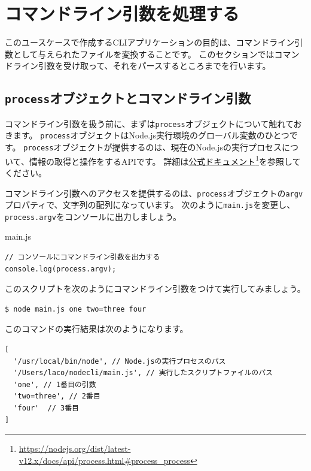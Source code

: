 \hypertarget{processing-commandline-args}{%
\section{コマンドライン引数を処理する}\label{processing-commandline-args}}

このユースケースで作成するCLIアプリケーションの目的は、コマンドライン引数として与えられたファイルを変換することです。
このセクションではコマンドライン引数を受け取って、それをパースするところまでを行います。

\hypertarget{process-object-and-commandline-args}{%
\subsection{\texorpdfstring{\texttt{process}オブジェクトとコマンドライン引数}{processオブジェクトとコマンドライン引数}}\label{process-object-and-commandline-args}}

コマンドライン引数を扱う前に、まずは\texttt{process}オブジェクトについて触れておきます。
\texttt{process}オブジェクトはNode.js実行環境のグローバル変数のひとつです。
\texttt{process}オブジェクトが提供するのは、現在のNode.jsの実行プロセスについて、情報の取得と操作をするAPIです。
詳細は\href{https://nodejs.org/dist/latest-v12.x/docs/api/process.html\#process_process}{公式ドキュメント}\footnote{\url{https://nodejs.org/dist/latest-v12.x/docs/api/process.html\#process_process}}を参照してください。

コマンドライン引数へのアクセスを提供するのは、\texttt{process}オブジェクトの\texttt{argv}プロパティで、文字列の配列になっています。
次のように\texttt{main.js}を変更し、\texttt{process.argv}をコンソールに出力しましょう。

\begin{listtitle}
main.js
\end{listtitle}
\begin{lstlisting}
// コンソールにコマンドライン引数を出力する
console.log(process.argv);
\end{lstlisting}
\listend

このスクリプトを次のようにコマンドライン引数をつけて実行してみましょう。

\begin{lstlisting}
$ node main.js one two=three four
\end{lstlisting}

このコマンドの実行結果は次のようになります。

\begin{lstlisting}
[ 
  '/usr/local/bin/node', // Node.jsの実行プロセスのパス
  '/Users/laco/nodecli/main.js', // 実行したスクリプトファイルのパス
  'one', // 1番目の引数
  'two=three', // 2番目
  'four'  // 3番目
]
\end{lstlisting}

